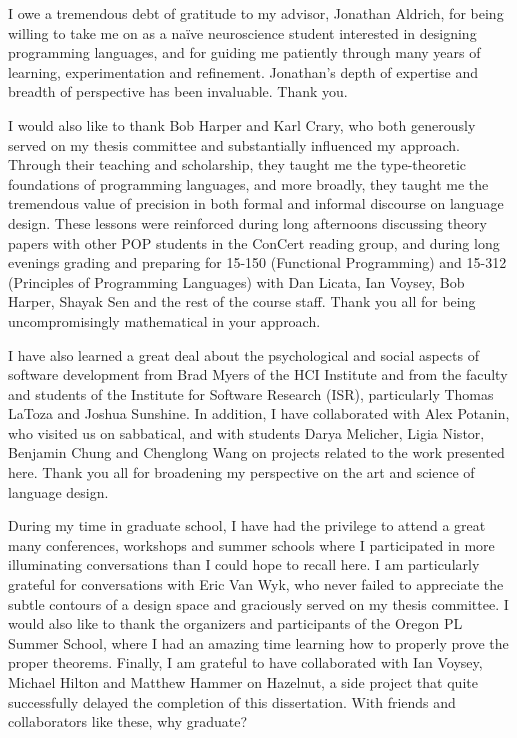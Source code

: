 \documentclass[12pt]{cmuthesis}
\begin{document}
\begin{acknowledgments}
I owe a tremendous debt of gratitude to my advisor, Jonathan Aldrich, for being willing to take me on as a na\"ive neuroscience student interested in designing programming languages, and for guiding me patiently through many years of learning, experimentation and refinement. 
Jonathan's depth of expertise and breadth of perspective has been invaluable. Thank you.%

I would also like to thank Bob Harper and Karl Crary, who both generously served on my thesis committee and substantially influenced my approach. Through their teaching and scholarship, they taught me the type-theoretic foundations of programming languages, and more broadly, they taught me the tremendous value of precision in both formal and informal discourse on language design. These lessons were reinforced during long afternoons discussing theory papers with other POP students in the ConCert reading group,  and during long evenings grading and preparing for 15-150 (Functional Programming) and 15-312 (Principles of Programming Languages) with Dan Licata, Ian Voysey, Bob Harper, Shayak Sen and the rest of the course staff. Thank you all for being uncompromisingly mathematical in your approach.

I have also learned a great deal about the psychological and social aspects of software development from Brad Myers of the HCI Institute and from the faculty and students of the Institute for Software Research (ISR), particularly Thomas LaToza and Joshua Sunshine. In addition, I have collaborated with Alex Potanin, who visited us on sabbatical, and with students Darya Melicher, Ligia Nistor, Benjamin Chung and Chenglong Wang on projects related to the work presented here. Thank you all for broadening my perspective on the art and science of language design. 

During my time in graduate school, I have had the privilege to attend a great many  conferences, workshops and summer schools where I participated in more illuminating conversations than I could  hope to recall here. I am particularly grateful for conversations with Eric Van Wyk, who never failed to appreciate the subtle contours of a design space and graciously served on my thesis committee. I would also like to thank the organizers and participants of the Oregon PL Summer School, where I had an amazing time learning how to properly prove the proper theorems. Finally, I am grateful to have collaborated with Ian Voysey, Michael Hilton and Matthew Hammer on Hazelnut, a side project that quite successfully delayed the completion of this dissertation. With friends and collaborators like these, why graduate?


\end{acknowledgments}
\end{document}
